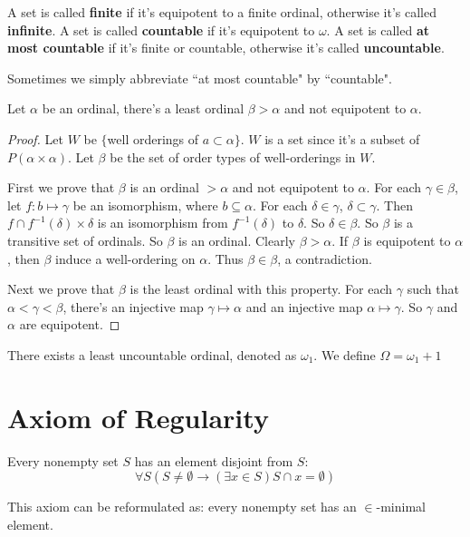 \documentclass[12pt]{book}
\begin{document}
\begin{definition}
	A set is called {\bf finite} if it's equipotent to a finite ordinal, otherwise it's called {\bf infinite}. A set is called {\bf countable} if it's equipotent to $\omega$. A set is called {\bf at most countable} if it's finite or countable, otherwise it's called {\bf uncountable}.
\end{definition}

Sometimes we simply abbreviate ``at most countable" by ``countable".

\begin{theorem}[Hartogs]
	Let $\alpha$ be an ordinal, there's a least ordinal $\beta>\alpha$ and not equipotent to $\alpha$.
\end{theorem}
\begin{proof}
	Let $W$ be $\{$well orderings of $ a\subset\alpha\}$. $W$ is a set since it's a subset of $P(\alpha\times\alpha)$. Let $\beta$ be the set of order types of well-orderings in $W$.
	
	First we prove that $\beta$ is an ordinal $>\alpha$ and not equipotent to $\alpha$. For each $\gamma\in \beta$, let $f:b\mapsto\gamma$ be an isomorphism, where $b\subseteq\alpha$. For each $\delta\in \gamma$, $\delta\subset\gamma$. Then $f\cap f^{-1}(\delta)\times\delta$ is an isomorphism from $f^{-1}(\delta)$ to $\delta$. So $\delta\in \beta$. So $\beta$ is a transitive set of ordinals. So $\beta$ is an ordinal. Clearly $\beta>\alpha$. If $\beta$ is equipotent to $\alpha$, then $\beta$ induce a well-ordering on $\alpha$. Thus $\beta\in\beta$, a contradiction. 
	
	Next we prove that $\beta$ is the least ordinal with this property. For each $\gamma$ such that $\alpha<\gamma<\beta$, there's an injective map $\gamma\mapsto\alpha$ and an injective map $\alpha\mapsto\gamma$. So $\gamma$ and $\alpha$ are equipotent.
\end{proof}

\begin{corollary}
	There exists a least uncountable ordinal, denoted as $\omega_1$. We define $\Omega=\omega_1+1$
\end{corollary}


\chapter{Axiom of Regularity}
\begin{axiom}
	Every nonempty set $S$ has an element disjoint from $S$:
	\begin{equation}
		\forall S(S\neq \emptyset\rightarrow(\exists x\in S)S\cap x=\emptyset)
	\end{equation}
	
	This axiom can be reformulated as: every nonempty set has an $\in$-minimal element.
\end{axiom}
\end{document}
